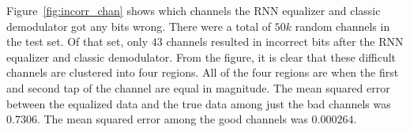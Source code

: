 Figure~\ref{fig:incorr_chan} shows which channels the RNN equalizer and classic demodulator got any bits wrong.  
There were a total of $50k$ random channels in the test set.  
Of that set, only $43$ channels resulted in incorrect bits after the RNN equalizer and classic demodulator.
From the figure, it is clear that these difficult channels are clustered into four regions. All of the four regions are when the first and second tap of the channel are equal in magnitude.
The mean squared error between the equalized data and the true data among just the bad channels was $0.7306$.  The mean squared error among the good channels was $0.000264$.



